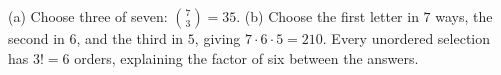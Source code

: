 (a) Choose three of seven: $\binom73=\boxed{35}$. (b) Choose the first letter in $7$ ways, the second in $6$, and the third in $5$, giving $7\cdot6\cdot5=\boxed{210}$. Every unordered selection has $3!=6$ orders, explaining the factor of six between the answers.
